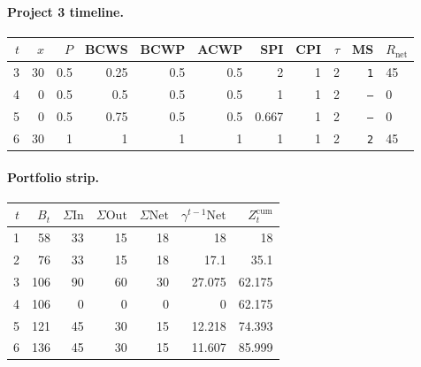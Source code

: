 \documentclass[12pt, a4paper]{article}
\begin{document}
\paragraph{Project 3 timeline.}
\begin{center}
\begin{tabular}{rrrrrrrrrrl}
\toprule
$t$ & $x$ & $P$ & BCWS & BCWP & ACWP & SPI & CPI & $\tau$ & MS & $R_{\mathrm{net}}$\\
\midrule
3 & 30 & 0.5 & 0.25 & 0.5 & 0.5 & 2 & 1 & 2 & \texttt{1} & 45 \\
4 & 0 & 0.5 & 0.5 & 0.5 & 0.5 & 1 & 1 & 2 & \texttt{---} & 0 \\
5 & 0 & 0.5 & 0.75 & 0.5 & 0.5 & 0.667 & 1 & 2 & \texttt{---} & 0 \\
6 & 30 & 1 & 1 & 1 & 1 & 1 & 1 & 2 & \texttt{2} & 45 \\
\bottomrule
\end{tabular}
\end{center}
\paragraph{Portfolio strip.}
\begin{center}
\begin{tabular}{rrrrrrr}
\toprule
$t$ & $B_t$ & $\Sigma\mathrm{In}$ & $\Sigma\mathrm{Out}$ & $\Sigma\mathrm{Net}$ & $\gamma^{t-1}\mathrm{Net}$ & $Z_t^{\mathrm{cum}}$\\
\midrule
1 & 58 & 33 & 15 & 18 & 18 & 18 \\
2 & 76 & 33 & 15 & 18 & 17.1 & 35.1 \\
3 & 106 & 90 & 60 & 30 & 27.075 & 62.175 \\
4 & 106 & 0 & 0 & 0 & 0 & 62.175 \\
5 & 121 & 45 & 30 & 15 & 12.218 & 74.393 \\
6 & 136 & 45 & 30 & 15 & 11.607 & 85.999 \\
\bottomrule
\end{tabular}
\end{center}
\end{document}
